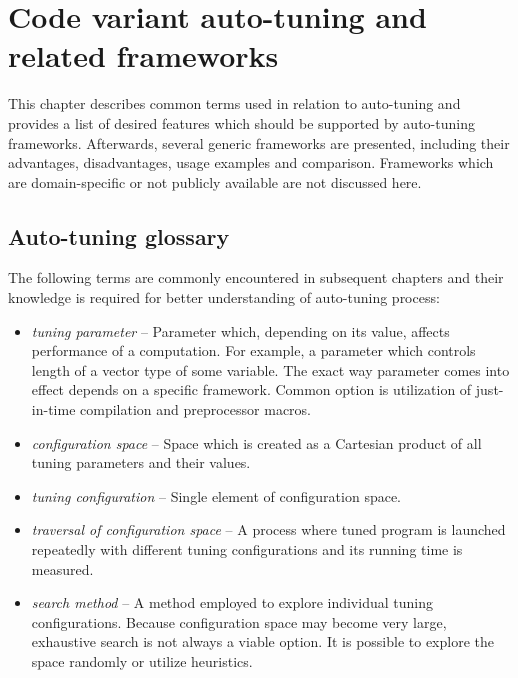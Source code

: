 \documentclass
[
    digital, %
    oneside, %
    table, %
    nolof, %
    nolot, %
    nocover %
]{fithesis3}
\begin{document}
\chapter{Code variant auto-tuning and related frameworks}
This chapter describes common terms used in relation to auto-tuning and provides a list of desired features which should be supported by auto-tuning
frameworks. Afterwards, several generic frameworks are presented, including their advantages, disadvantages, usage examples and comparison. Frameworks
which are domain-specific or not publicly available are not discussed here.

\section{Auto-tuning glossary}
The following terms are commonly encountered in subsequent chapters and their knowledge is required for better understanding of auto-tuning process:
\begin{itemize}
    \item \textit{tuning parameter} -- Parameter which, depending on its value, affects performance of a computation. For example, a parameter which
    controls length of a vector type of some variable. The exact way parameter comes into effect depends on a specific framework. Common option is
    utilization of just-in-time compilation and preprocessor macros.
    \item \textit{configuration space} -- Space which is created as a Cartesian product of all tuning parameters and their values.
    \item \textit{tuning configuration} -- Single element of configuration space.
    \item \textit{traversal of configuration space} -- A process where tuned program is launched repeatedly with different tuning configurations and
    its running time is measured.
    \item \textit{search method} -- A method employed to explore individual tuning configurations. Because configuration space may become very large,
    exhaustive search is not always a viable option. It is possible to explore the space randomly or utilize heuristics.
\end{itemize}
\end{document}
